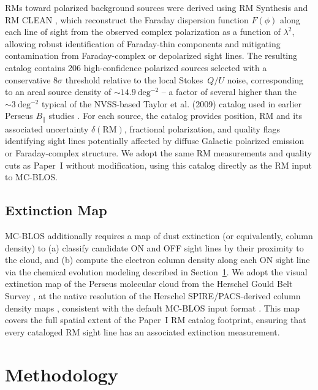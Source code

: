 \documentclass[twocolumn]{aastex631}
\begin{document}
RMs toward polarized background sources were derived using RM Synthesis \citep{burn1966, brentjens2005} and RM CLEAN \citep{heald2009}, which reconstruct the Faraday dispersion function $F(\phi)$ along each line of sight from the observed complex polarization as a function of $\lambda^2$, allowing robust identification of Faraday-thin components and mitigating contamination from Faraday-complex or depolarized sight lines. The resulting catalog contains 206 high-confidence polarized sources selected with a conservative $8\sigma$ threshold relative to the local Stokes~$Q/U$ noise, corresponding to an areal source density of $\sim14.9~\mathrm{deg^{-2}}$ -- a factor of several higher than the $\sim3~\mathrm{deg^{-2}}$ typical of the NVSS-based Taylor et al. (2009) catalog used in earlier Perseus $B_\parallel$ studies \citep{tahani2018}. For each source, the catalog provides position, RM and its associated uncertainty $\delta(\mathrm{RM})$, fractional polarization, and quality flags identifying sight lines potentially affected by diffuse Galactic polarized emission or Faraday-complex structure. We adopt the same RM measurements and quality cuts as Paper~I without modification, using this catalog directly as the RM input to MC-BLOS.

\subsection{Extinction Map}

MC-BLOS additionally requires a map of dust extinction (or equivalently, column density) to (a) classify candidate ON and OFF sight lines by their proximity to the cloud, and (b) compute the electron column density along each ON sight line via the chemical evolution modeling described in Section~\ref{sec:method}. We adopt the visual extinction map of the Perseus molecular cloud from the Herschel Gould Belt Survey \citep[HGBS;][]{andre2010}, at the native resolution of the Herschel SPIRE/PACS-derived column density maps \citep[cf.][]{kainulainen2009}, consistent with the default MC-BLOS input format \citep{tahani2025mcblos}. This map covers the full spatial extent of the Paper~I RM catalog footprint, ensuring that every cataloged RM sight line has an associated extinction measurement.

\section{Methodology}
\label{sec:method}
\end{document}
